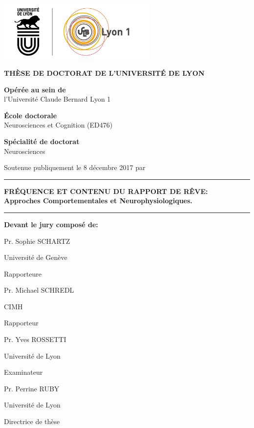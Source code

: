 \begin{titlepage}

  \setlength{\parindent}{0pt}
  \thispagestyle{empty}

  \begin{center}
  \includegraphics[height=3cm]{content/logo}
  \end{center}

  \bigskip

  \begin{center}
  \fontsize{14pt}{16pt}\selectfont
  \textbf{THÈSE DE DOCTORAT DE L'UNIVERSITÉ DE LYON}\\

  \bigskip

  \fontsize{12pt}{14pt}\selectfont
  \textbf{Opérée au sein de}\\ \medskip
  l'Université Claude Bernard Lyon 1

  \textbf{École doctorale}\\ \medskip
  Neurosciences et Cognition (ED476)

  \textbf{Spécialité de doctorat}\\ \medskip
  Neurosciences

  Soutenue publiquement le 8 décembre 2017 par\\ \medskip
  \fontsize{14pt}{16pt}\selectfont
  \textbf{\thesisName}

  \rule{\textwidth}{0.5pt}

  \fontsize{16pt}{20pt}\selectfont
  \textbf{FRÉQUENCE ET CONTENU DU RAPPORT DE RÊVE:\\ \medskip
  Approches Comportementales et Neurophysiologiques.}
  \rule{\textwidth}{0.5pt}

  \end{center}

  \fontsize{12pt}{14pt}\selectfont
  \textbf{Devant le jury composé de:}

  \newcommand\textline[4][t]{%
      \par\noindent\parbox[#1]{.333\textwidth}{\raggedright#2}%
      \parbox[#1]{.333\textwidth}{\centering#3}%
      \parbox[#1]{.333\textwidth}{\raggedleft#4}\par
  }

  \textline[t]{Pr. Sophie SCHARTZ}{Université de Genève}{Rapporteure}
  \textline[t]{Pr. Michael SCHREDL}{CIMH}{Rapporteur}
  \textline[t]{Pr. Yves ROSSETTI}{Université de Lyon}{Examinateur}
  \textline[t]{Pr. Perrine RUBY }{Université de Lyon}{Directrice de thèse}

\end{titlepage}

\cleardoublepage

